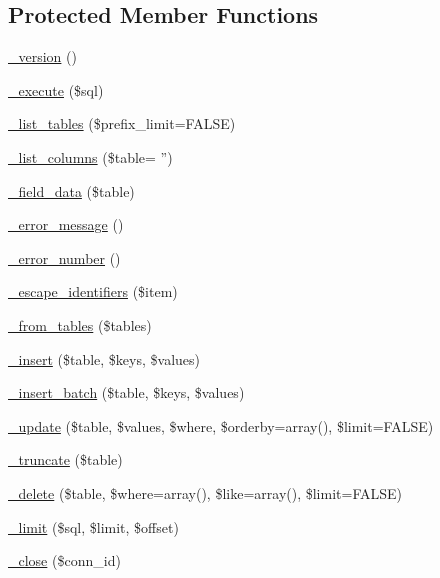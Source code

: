 \subsection*{Protected Member Functions}
\begin{DoxyCompactItemize}
\item 
\hyperlink{class_c_i___d_b__oci8__driver_ac997a462bb342f97f414910f0e033fb6}{\-\_\-version} ()
\item 
\hyperlink{class_c_i___d_b__oci8__driver_a114ab675d89bf8324a41785fb475e86d}{\-\_\-execute} (\$sql)
\item 
\hyperlink{class_c_i___d_b__oci8__driver_a435c0f3ce54fe7daa178baa8532ebd54}{\-\_\-list\-\_\-tables} (\$prefix\-\_\-limit=F\-A\-L\-S\-E)
\item 
\hyperlink{class_c_i___d_b__oci8__driver_a2a81bb476a5c76fe6f763b0557c1e4c2}{\-\_\-list\-\_\-columns} (\$table= '')
\item 
\hyperlink{class_c_i___d_b__oci8__driver_a95247d9671893adc3444cb184ad32ea1}{\-\_\-field\-\_\-data} (\$table)
\item 
\hyperlink{class_c_i___d_b__oci8__driver_a4ca764fe1d6ad526f770f36b5f332bbb}{\-\_\-error\-\_\-message} ()
\item 
\hyperlink{class_c_i___d_b__oci8__driver_a3e48199b3a946499b7e5fba0cdfa6b86}{\-\_\-error\-\_\-number} ()
\item 
\hyperlink{class_c_i___d_b__oci8__driver_aeabfb3952399caa92a013621a98e3042}{\-\_\-escape\-\_\-identifiers} (\$item)
\item 
\hyperlink{class_c_i___d_b__oci8__driver_a885a8b4372b5c099749cefa73767a744}{\-\_\-from\-\_\-tables} (\$tables)
\item 
\hyperlink{class_c_i___d_b__oci8__driver_a69ee76b136052e0a8f06097fb388e53e}{\-\_\-insert} (\$table, \$keys, \$values)
\item 
\hyperlink{class_c_i___d_b__oci8__driver_a1978e1358c812587a46e242630365099}{\-\_\-insert\-\_\-batch} (\$table, \$keys, \$values)
\item 
\hyperlink{class_c_i___d_b__oci8__driver_ae869ae2275175c5ffa22816a02099d96}{\-\_\-update} (\$table, \$values, \$where, \$orderby=array(), \$limit=F\-A\-L\-S\-E)
\item 
\hyperlink{class_c_i___d_b__oci8__driver_aa029600528fc1ce660a23ff4b4667f95}{\-\_\-truncate} (\$table)
\item 
\hyperlink{class_c_i___d_b__oci8__driver_ace3cbc04a520b7811fc956cdb9ae1c19}{\-\_\-delete} (\$table, \$where=array(), \$like=array(), \$limit=F\-A\-L\-S\-E)
\item 
\hyperlink{class_c_i___d_b__oci8__driver_aeeaa5cd68dc6ace010c0b8aae89c2d15}{\-\_\-limit} (\$sql, \$limit, \$offset)
\item 
\hyperlink{class_c_i___d_b__oci8__driver_a557bd6ddde8de1f7814e10b1120efd29}{\-\_\-close} (\$conn\-\_\-id)
\end{DoxyCompactItemize}


